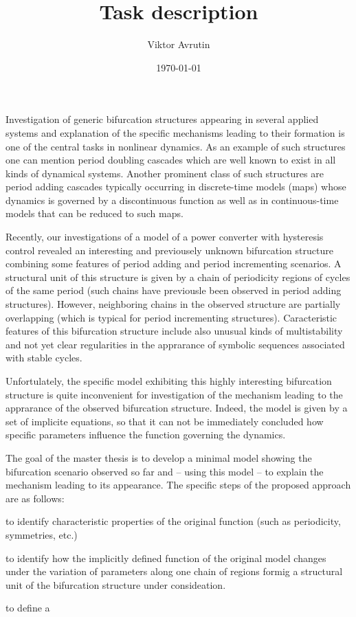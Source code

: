 \documentclass{article}
\begin{document}
\title{Task description}
\author{Viktor Avrutin}
\date{\today}
\maketitle

Investigation of generic bifurcation structures appearing in several
applied systems and explanation of the specific mechanisms leading to
their formation is one of the central tasks in nonlinear dynamics.  As
an example of such structures one can mention period doubling cascades
which are well known to exist in all kinds of dynamical systems.
Another prominent class of such structures are period adding cascades
typically occurring in discrete-time models (maps) whose dynamics is
governed by a discontinuous function as well as in continuous-time
models that can be reduced to such maps.

Recently, our investigations of a model of a power converter with
hysteresis control revealed an interesting and previousely unknown
bifurcation structure combining some features of period adding and
period incrementing scenarios.  A structural unit of this structure is
given by a chain of periodicity regions of cycles of the same period
(such chains have previousle been observed in period adding
structures). However, neighboring chains in the observed structure are
partially overlapping (which is typical for period incrementing
structures).  Caracteristic features of this bifurcation structure
include also unusual kinds of multistability and not yet clear
regularities in the apprarance of symbolic sequences associated with
stable cycles.

Unfortulately, the specific model exhibiting this highly interesting
bifurcation structure is quite inconvenient for investigation of the
mechanism leading to the apprarance of the observed bifurcation
structure. Indeed, the model is given by a set of implicite equations,
so that it can not be immediately concluded how specific parameters
influence the function governing the dynamics.

The goal of the master thesis is to develop a minimal model showing
the bifurcation scenario observed so far and -- using this model -- to
explain the mechanism leading to its appearance.  The specific steps
of the proposed approach are as follows:
\begin{compactenum}
\item to identify characteristic properties of the original function
  (such as periodicity, symmetries, etc.)
\item to identify how the implicitly defined function of the original
  model changes under the variation of parameters along one chain of regions
  formig a structural unit of the bifurcation structure under consideation.
\item to define a 
\end{compactenum}
\end{document}
